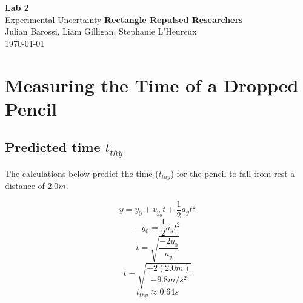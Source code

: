 \documentclass[11pt, letterpaper, includehead]{article}
\renewcommand{\arraystretch}{1.2}
\begin{document}
\begin{titlepage}
  \begin{center}
    \Huge{\textbf{Lab 2}}\\
    \Huge{Experimental Uncertainty}
    \vfill
    \large{\textbf{Rectangle Repulsed Researchers}}\\
    \large{Julian Barossi, Liam Gilligan, Stephanie L'Heureux}\\
    \vspace{0.5cm}
    \normalsize
    \today
  \end{center}
\end{titlepage}

\tableofcontents
\pagebreak %

\pagestyle{fancy}
\fancyhead{}

\section{Measuring the Time of a Dropped Pencil} %

\subsection{Predicted time $t_{thy}$} %
The calculations below predict the time ($t_{thy}$) for the pencil to
fall from rest a distance of $2.0m$.

$$y       = y_0 + v_{y_0}t + \frac{1}{2}a_yt^2$$
$$-y_0    = \frac{1}{2}a_yt^2$$
$$t       = \sqrt{\frac{-2y_0}{a_y}}$$
$$t       = \sqrt{\frac{-2(2.0m)}{-9.8m/s^2}}$$
$$\boxed{t_{thy}\approx 0.64s}$$

\renewcommand{\arraystretch}{1.2}
\end{document}
